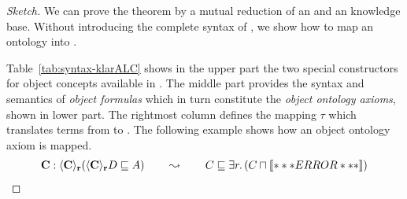 \begin{proof}[Sketch]
  We can prove the theorem by a mutual reduction of an \klarALC and an \ALCALCplus knowledge base.
  Without introducing the complete syntax of \klarALC, we show how to map an \klarALC ontology into
  \ALCALCplus.

  Table~\ref{tab:syntax-klarALC} shows in the upper part the two special constructors for object
  concepts available in \klarALC. The middle part provides the syntax and semantics of \emph{object
    formulas} which in turn constitute the \emph{object ontology axioms}, shown in lower part. The
  rightmost column defines the mapping $\tau$ which translates terms from \klarALC to
  \ALCALCplus. The following example shows how an object ontology axiom is mapped.
  \begin{align*}
    \mathbf{C}:\langle \mathbf{C} \rangle_{\mathbf{r}}(\langle \mathbf{C}\rangle_{\mathbf{r}}D
    \sqsubseteq A) 
    \qquad\leadsto\qquad
    C\sqsubseteq\exists r.\left(C\sqcap\oax{\ocont{C}[r]{D}\sqsubseteq A}\right)
  \end{align*}


\end{proof}
